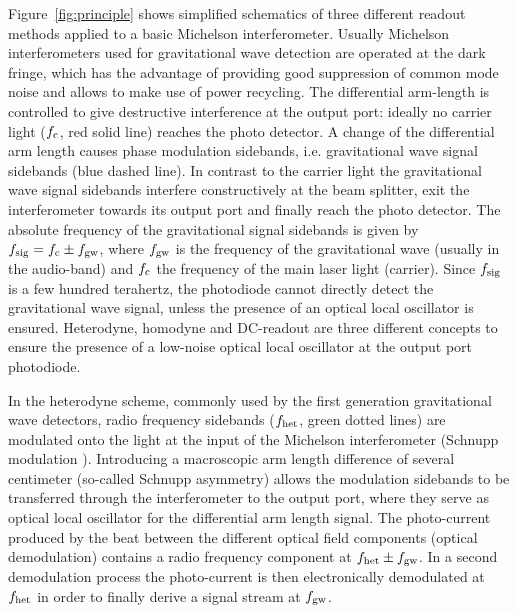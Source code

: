 Figure~\ref{fig:principle} shows simplified schematics of three different readout
methods applied to a basic Michelson interferometer. Usually Michelson
interferometers used for gravitational wave detection are operated at the dark
 fringe, which  has the advantage
 of providing good suppression of common mode noise and allows to 
make use of power recycling.
The differential arm-length is controlled
to give destructive interference at the output port: ideally
 no carrier light ($f_{\rm c}$, red solid line) reaches the photo detector.
 A change of the differential arm length causes phase modulation
sidebands, i.e. gravitational
wave signal sidebands (blue dashed line). In contrast to the carrier light the gravitational
wave signal sidebands
 interfere constructively at the beam splitter, exit the interferometer towards its output port
and finally reach the photo detector.
The absolute frequency of the gravitational signal sidebands is given
 by $f_{\rm sig} =  f_{\rm c} \pm f_{\rm gw}$, where $f_{\rm gw}$ is the
 frequency of the gravitational wave (usually in the audio-band) and $f_{\rm c}$ 
the frequency of the main laser light (carrier).
Since $f_{\rm sig}$ is
a few hundred terahertz, the photodiode cannot directly detect
the gravitational wave signal, unless the presence of an optical local oscillator
is ensured. Heterodyne, homodyne and DC-readout are three different concepts to
ensure the presence of a low-noise optical local oscillator at the output port photodiode.


In the heterodyne scheme, commonly used by the first generation
gravitational wave detectors,
 radio frequency  sidebands ($f_{\rm het}$, green dotted lines)
are modulated onto the light at the input of
the Michelson interferometer (Schnupp modulation \cite{Schnupp1988}).
Introducing a macroscopic arm length difference of several centimeter
 (so-called Schnupp asymmetry) allows the modulation
sidebands to be transferred through the interferometer to the output port,
where they serve as optical local oscillator for the differential arm length  signal.
The photo-current produced by the beat between the different optical
field components (optical demodulation) contains
a radio frequency component at $f_{\rm het} \pm f_{\rm gw}$. In a second demodulation
process the photo-current is then electronically demodulated at $f_{\rm het}$ 
 in order to finally derive a signal stream at $f_{\rm gw}$.


